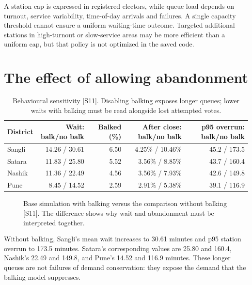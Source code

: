 \documentclass[11pt,a4paper,oneside]{report}
\newcommand{\source}[1]{\par\nopagebreak[4]{\footnotesize\color{teal}Evidence: #1.}\par}
\begin{document}
A station cap is expressed in registered electors, while queue load depends on turnout, service variability, time-of-day arrivals and failures. A single capacity threshold cannot ensure a uniform waiting-time outcome. Targeted additional stations in high-turnout or slow-service areas may be more efficient than a uniform cap, but that policy is not optimized in the saved code.
\source{[S11]}

\section{The effect of allowing abandonment}
\begin{table}[htbp]\centering
\small
\setlength{\tabcolsep}{5pt}
\caption{Behavioural sensitivity [S11]. Disabling balking exposes longer queues; lower waits with balking must be read alongside lost attempted votes.}
\begin{tabular}{lrrrr}
\toprule
District & Wait: balk/no balk & Balked (\%) & After close: balk/no balk & p95 overrun: balk/no balk\\
\midrule
Sangli & 14.26 / 30.61 & 6.50 & 4.25\% / 10.46\% & 45.2 / 173.5\\
Satara & 11.83 / 25.80 & 5.52 & 3.56\% / 8.85\% & 43.7 / 160.4\\
Nashik & 11.36 / 22.49 & 4.56 & 3.56\% / 7.93\% & 42.6 / 149.8\\
Pune & 8.45 / 14.52 & 2.59 & 2.91\% / 5.38\% & 39.1 / 116.9\\
\bottomrule\end{tabular}
\end{table}
\begin{figure}[htbp]\centering
{}
\caption{Base simulation with balking versus the comparison without balking [S11]. The difference shows why wait and abandonment must be interpreted together.}\end{figure}
Without balking, Sangli's mean wait increases to 30.61 minutes and p95 station overrun to 173.5 minutes. Satara's corresponding values are 25.80 and 160.4, Nashik's 22.49 and 149.8, and Pune's 14.52 and 116.9 minutes. These longer queues are not failures of demand conservation: they expose the demand that the balking model suppresses.
\end{document}

